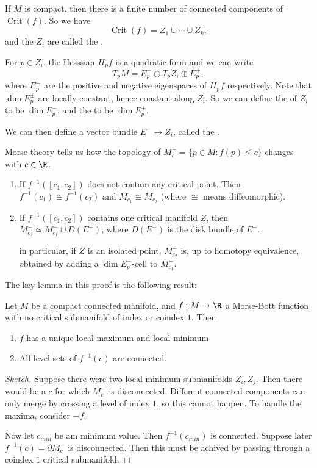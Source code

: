 \documentclass[a4paper]{article}
\DeclareMathOperator{\Crit}{Crit}
\begin{document}
If $M$ is compact, then there is a finite number of connected components of $\Crit(f)$. So we have
\[
  \Crit(f) = Z_1 \cup \cdots \cup Z_k,
\]
and the $Z_i$ are called the .

For $p \in Z_i$, the Hesssian $H_p f$ is a quadratic form and we can write
\[
  T_p M = E_p^- \oplus T_p Z_i \oplus E_p^+,
\]
where $E_p^{\pm}$ are the positive and negative eigenspaces of $H_p f$ respectively. Note that $\dim E_p^{\pm}$ are locally constant, hence constant along $Z_i$. So we can define the  of $Z_i$ to be $\dim E_p^-$, and the  to be $\dim E_p^+$.

We can then define a vector bundle $E^- \to Z_i$, called the .

Morse theory tells us how the topology of $M_c^- = \{p \in M: f(p) \leq c\}$ changes with $c \in \R$.
\begin{thm}\leavevmode
  \begin{enumerate}
    \item If $f^{-1}([c_1, c_2])$ does not contain any critical point. Then $f^{-1}(c_1) \cong f^{-1}(c_2)$ and $M_{c_1} \cong M_{c_2}$ (where $\cong$ means diffeomorphic).
    \item If $f^{-1}([c_1, c_2])$ contains one critical manifold $Z$, then $M_{c_2}^- \simeq M_{c_1}^- \cup D(E^-)$, where $D(E^-)$ is the disk bundle of $E^-$.

      in particular, if $Z$ is an isolated point, $M_{c_2}^-$ is, up to homotopy equivalence, obtained by adding a $\dim E_p^-$-cell to $M_{c_1}^-$.
  \end{enumerate}
\end{thm}
The key lemma in this proof is the following result:
\begin{lemma}
  Let $M$ be a compact connected manifold, and $f: M \to \R$ a Morse-Bott function with no critical submanifold of index or coindex $1$. Then
  \begin{enumerate}
    \item $f$ has a unique local maximum and local minimum
    \item All level sets of $f^{-1}(c)$ are connected.
  \end{enumerate}
\end{lemma}

\begin{proof}[Sketch]
  Suppose there were two local minimum submanifolds $Z_i, Z_j$. Then there would be a $c$ for which $M_c^-$ is disconnected. Different connected components can only merge by crossing a level of index $1$, so this cannot happen. To handle the maxima, consider $-f$.

  Now let $c_{min}$ be am minimum value. Then $f^{-1}(c_{min})$ is connected. Suppose later $f^{-1}(c) = \partial M_c^-$ is disconnected. Then this must be achived by passing through a coindex $1$ critical submanifold.
\end{proof}
\end{document}

